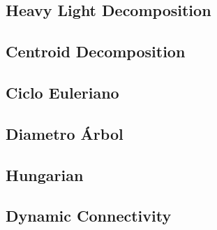 \subsection{Heavy Light Decomposition}

\subsection{Centroid Decomposition}

\subsection{Ciclo Euleriano}

\subsection{Diametro \'Arbol}

\subsection{Hungarian}

\newpage
\subsection{Dynamic Connectivity}
